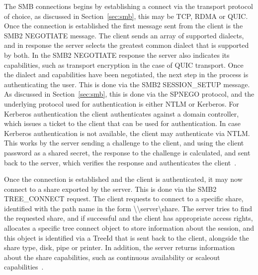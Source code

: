 \documentclass[english, 12pt, a4paper, elec, utf8, a-2b, online]{aaltothesis}
\begin{document}
The SMB connections begins by establishing a connect via the transport protocol
of choice, as discussed in Section~\ref{sec:smb}, this may be TCP, RDMA or QUIC.
Once the connection is established the first message sent from the client is
the SMB2 NEGOTIATE message. The client sends an array of supported dialects,
and in response the server selects the greatest common dialect that is supported
by both. In the SMB2 NEGOTIATE response the server also indicates its capabilities,
such as transport encryption in the case of QUIC transport. Once the dialect and
capabilities have been negotiated, the next step in the process is authenticating
the user. This is done via the SMB2 SESSION\_SETUP message. As discussed in Section~\ref{sec:smb},
this is done via the SPNEGO protocol, and the underlying protocol used for authentication
is either NTLM or Kerberos. For Kerberos authentication the client authenticates
against a domain controller, which issues a ticket to the client that can be used for
authentication. In case Kerberos authentication is not available, the client may
authenticate via NTLM. This works by the server sending a challenge to the client,
and using the client password as a shared secret, the response to the challenge is
calculated, and sent back to the server, which verifies the response and authenticates
the client~\cite{smb2_tech}.

Once the connection is established and the client is authenticated, it may now connect
to a share exported by the server. This is done via the SMB2 TREE\_CONNECT request.
The client requests to connect to a specific share, identified with the path name
in the form {\textbackslash\textbackslash}server{\textbackslash}share. The server
tries to find the requested share, and if successful and the client has appropriate
access rights, allocates a specific tree connect object to store information about the session,
and this object is identified via a TreeId that is sent back to the client, alongside
the share type, disk, pipe or printer. In addition,
the server returns information about the share capabilities, such as continuous availability
or scaleout capabilities~\cite{smb2_tech}.
\end{document}
